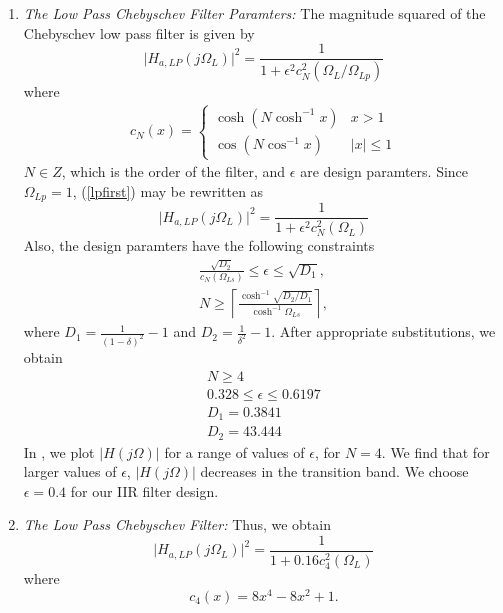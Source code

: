 \documentclass{article}
\begin{document}
\begin{enumerate}
\item {\em The Low Pass Chebyschev Filter Paramters:}  The magnitude squared of the Chebyschev low pass filter is given by 
\begin{equation}
\label{lpfirst}
\vert H_{a,LP}(j\Omega_L)\vert^2 = \frac{1}{1 + \epsilon^2c_N^2(\Omega_L/\Omega_{Lp})}
\end{equation}
where \begin{align}
c_N(x) =
    \begin{cases}
   \cosh(N \cosh^{-1}x) & x > 1 \nonumber \\
   \cos(N \cos^{-1}x) & |x| \leq 1 
    \end{cases}
\end{align}
$N\in Z$, which is the order of the filter, and $\epsilon$ are design paramters.  Since $\Omega_{Lp} = 1$, (\ref{lpfirst}) may be rewritten as
\begin{equation}
\label{lpsecond}
\vert H_{a,LP}(j\Omega_L)\vert^2 = \frac{1}{1 + \epsilon^2c_N^2(\Omega_L)}
\end{equation}
Also, the design paramters have the following constraints
\begin{eqnarray}
\label{lpdesign}
\frac{\sqrt{D_2}}{c_N(\Omega_{Ls})} \leq \epsilon \leq \sqrt{D_1}, \nonumber \\
N \geq \left\lceil \frac{\cosh^{-1}\sqrt{D_2/D_1}}{\cosh^{-1}\Omega_{Ls}} \right\rceil,
\end{eqnarray}
where $D_1 = \frac{1}{(1 - \delta)^2}-1$ and $D_2 = \frac{1}{\delta^2} - 1$.  After appropriate substitutions,
we obtain \begin{align}
    N \geq 4\\
    0.328 \leq \epsilon \leq 0.6197\\
    D_1 = 0.3841\\
    D_2 = 43.444
\end{align} 
In , we plot $\vert H(j\Omega)\vert$ for a range of values of $\epsilon$, for $N = 4$.  We find that for larger values of $\epsilon$, $|H(j\Omega)|$ decreases in the transition band.  We choose $\epsilon = 0.4$  for our IIR filter design.  
\item {\em The Low Pass Chebyschev Filter:} Thus, we obtain
\begin{equation}
\label{lpsqfinal}
\vert H_{a,LP}(j\Omega_L)\vert^2 = \frac{1}{1 + 0.16c_4^2(\Omega_L)} 
\end{equation}
where
\begin{equation}
c_4(x) = 8x^4 - 8x^2 + 1.	
\end{equation}

\end{enumerate}
\end{document}

